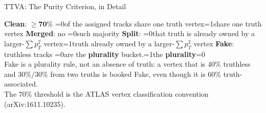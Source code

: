 \documentclass[xcolor=table,aspectratio=169]{beamer}
\providecommand{\talkbuild}{0}
\newcommand{\readingonly}[1]{\ifnum\talkbuild=0\relax#1\fi}
\newcommand{\talkonly}[1]{\ifnum\talkbuild=1\relax#1\fi}
\begin{document}
\begin{frame}{TTVA: The Purity Criterion, in Detail}
\begin{center}
{}
    \end{center}
    \vspace{-0.3em}
    {\scriptsize \textbf{Clean}: $\mathbf{\geq70\%}$ \readingonly{of the assigned tracks share one truth vertex}\talkonly{share one truth vertex} \;\textbullet\;
    \textbf{Merged}: no \readingonly{such }majority \;\textbullet\;
    \textbf{Split}: \readingonly{that truth is already owned by a larger-$\sum p_T^2$ vertex}\talkonly{truth already owned by a larger-$\sum p_T^2$ vertex} \;\textbullet\;
    \textbf{Fake}: truthless tracks \readingonly{are the \textbf{plurality} bucket.}\talkonly{the \textbf{plurality}}}\readingonly{\\[2pt]
    {\scriptsize\textcolor{black!55}{Fake is a plurality rule, not an absence of truth: a vertex
    that is $40\%$ truthless and $30\%/30\%$ from two truths is booked Fake, even though it is
    $60\%$ truth-associated.}\\[1pt]
    The $70\%$ threshold is the ATLAS vertex classification convention (arXiv:1611.10235).}}
\end{frame}
\end{document}
